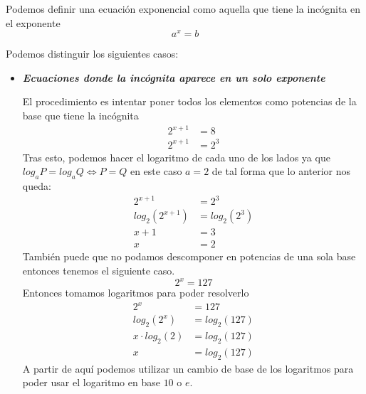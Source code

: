 \begin{defi}
Podemos definir una ecuación exponencial como aquella que tiene la incógnita en el exponente
\begin{equation*}
a^x=b
\end{equation*}
\end{defi}
\noindent
Podemos distinguir los siguientes casos:
\begin{itemize}
\item \textbf{\textit{Ecuaciones donde la incógnita aparece en un solo exponente}}

El procedimiento es intentar poner todos los elementos como potencias de la base que tiene la incógnita
\begin{align*}
2^{x+1}&=8\\
2^{x+1}&=2^3
\end{align*}
Tras esto, podemos hacer el logaritmo de cada uno de los lados ya que $log_a P=log_a Q \Leftrightarrow P=Q$ en este caso $a=2$ de tal forma que lo anterior nos queda:
\begin{align*}
2^{x+1}&=2^3\\
log_2( 2^{x+1})&=log_2 (2^3)\\
x+1&=3\\
x&=2
\end{align*}
También puede que no podamos descomponer en potencias de una sola base entonces tenemos el siguiente caso.
\begin{equation*}
2^x=127
\end{equation*}
Entonces tomamos logaritmos para poder resolverlo
\begin{align*}
2^x&=127\\
log_2(2^x)&=log_2(127)\\
x \cdot log_2(2)&=log_2(127)\\
x&=log_2(127)
\end{align*}
A partir de aquí podemos utilizar un cambio de base de los logaritmos para poder usar el logaritmo en base $10$ o $e$.


\end{itemize}
